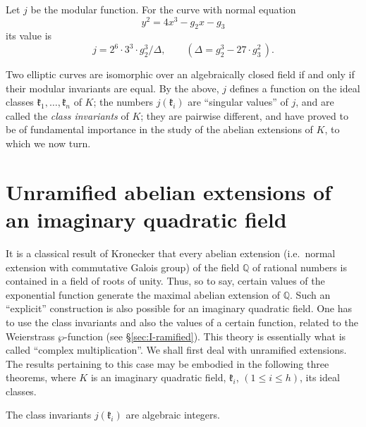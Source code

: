 Let $j$ be the modular function. For the curve with normal equation
\[
y^{2}=4x^{3}-g_{2}x-g_{3}
\]
its value is
\[
j=2^{6}\cdot 3^{3}\cdot g_{2}^{3}/\Delta,\qquad
(\Delta=g_{2}^{3}-27\cdot g_{3}^{2}\,).
\]

Two elliptic curves are isomorphic over an algebraically closed field if
and only if their modular invariants are equal. By the above, $j$ defines
a function on the ideal classes $\mathfrak{k}_{1},\ldots,\mathfrak{k}_{n}$
of $K$; the numbers $j(\mathfrak{k}_{i})$ are ``singular values'' of $j$,
and are called the \emph{class invariants} of $K$; they are pairwise
different, and have proved to be of fundamental importance in the study
of the abelian extensions of $K$, to which we now turn.

\section{Unramified abelian extensions of an imaginary quadratic field}

It is a classical result of Kronecker that every abelian extension
(i.e.\ normal extension with commutative Galois group) of the field
$\mathbb{Q}$ of rational numbers is contained in a field of roots of
unity. Thus, so to say, certain values of the exponential function
generate the maximal abelian extension of $\mathbb{Q}$. Such an
``explicit'' construction is also possible for an imaginary quadratic
field. One has to use the class invariants and also the values of a
certain function, related to the Weierstrass $\wp$-function
(see §\ref{sec:I-ramified}). This theory is essentially what is called
``complex multiplication''. We shall first deal with unramified
extensions. The results pertaining to this case may be embodied in the
following three theorems, where $K$ is an imaginary quadratic field,
$\mathfrak{k}_{i}$, $(1\leq i\leq h)$, its ideal classes.

\setcounter{theorem}{0}
\renewcommand{\thetheorem}{\Roman{theorem}}

\begin{theorem}\label{thm:I-one}
The class invariants $j(\mathfrak{k}_{i})$ are algebraic integers.
\end{theorem}



